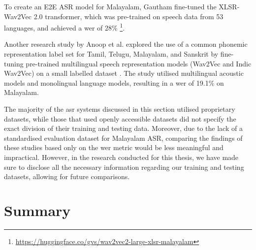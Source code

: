 \begin{enumerate}
To create an E2E ASR model for Malayalam, Gautham fine-tuned the XLSR- Wav2Vec 2.0 transformer, which was pre-trained on speech data from 53 languages, and achieved a \gls{wer} of 28\% \footnote{\url{https://huggingface.co/gvs/wav2vec2-large-xlsr-malayalam}}.

Another research study by Anoop et al. explored the use of a common phonemic representation label set for Tamil, Telugu, Malayalam, and Sanskrit by fine-tuning pre-trained multilingual speech representation models (Wav2Vec and Indic Wav2Vec) on a small labelled dataset \cite{anoop2023exploring}. The study utilised multilingual acoustic models and monolingual language models, resulting in a \gls{wer} of 19.1\% on Malayalam.
    

\end{enumerate}

The majority of the \gls{asr} systems discussed in this section utilised proprietary datasets, while those that used openly accessible datasets did not specify the exact division of their training and testing data. Moreover, due to the lack of a standardised evaluation dataset for Malayalam ASR, comparing the findings of these studies based only on the \gls{wer} metric would be less meaningful and impractical. However, in the research conducted for this thesis, we have made sure to disclose all the necessary information regarding our training and testing datasets, allowing for future comparisons.









\section{Summary}

